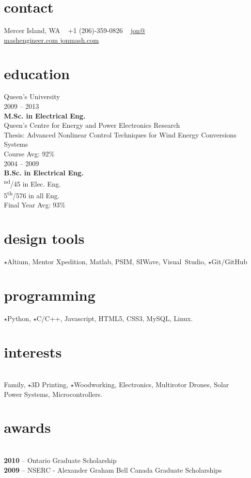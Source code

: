 
\begin{aside}
%
\section{contact}
Mercer Island, WA
~
+1 (206)-359-0826
~
\href{mailto:jon@mashengineer.com}{jon@\\mashengineer.com \faEnvelope}
\href{http://www.jonmash.com}{jonmash.com \faLink}
%
\section{education}
\restorecr
{\headingfont Queen's University}\\
{2009 -- 2013} \\
\textbf{M.Sc. {\normalfont in Electrical Eng.}}\\
{\bodyfontit Queen’s Centre for Energy and Power Electronics Research}\\
Thesis: Advanced Nonlinear Control Techniques for Wind Energy Conversions Systems\\
Course Avg: 92\%\\
\vspace{0.3cm}
{2004 -- 2009} \\
\textbf{B.Sc. {\normalfont in Electrical Eng.}}\\
{\textsuperscript{nd}/45 in Elec. Eng. \\ 5\textsuperscript{th}/576 in all Eng.}\\
Final Year Avg: 93\%\\
%
\section{design tools}
{\color{orange} $\star$}Altium, Mentor Xpedition, Matlab, PSIM, SIWave, Visual~Studio, {\color{orange} $\star$}Git/GitHub
%
\section{programming}
{\color{orange} $\star$}Python, {\color{orange} $\star$}C/C++, Javascript, HTML5, CSS3, MySQL, Linux.
%
\section{interests}\\
Family, {\color{orange} $\star$}3D Printing, {\color{orange} $\star$}Woodworking, Electronics, Multirotor Drones, Solar Power Systems, Microcontrollers.
%
\section{awards}\\
{\textbf{2010}} -- {\bodyfontit Ontario Graduate Scholarship}\\
\vspace{0.3cm}
{\textbf{2009}} -- {\bodyfontit NSERC - Alexander Graham Bell Canada Graduate Scholarships}\\
\obeycr
\end{aside}